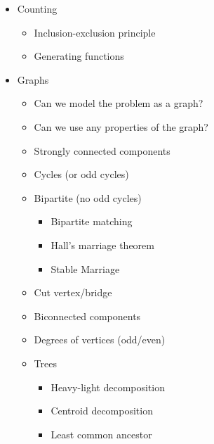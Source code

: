 \documentclass[8pt,a4paper,landscape,oneside]{amsart}
\newenvironment{myitemize}
{ \begin{itemize}[leftmargin=.5cm]
    \setlength{\itemsep}{0pt}
    \setlength{\parskip}{0pt}
    \setlength{\parsep}{0pt}     }
{ \end{itemize}                  }
\begin{document}
\begin{multicols*}{3}
\begin{myitemize}
                    \begin{itemize}
                        \item Sqrt buckets
                        \item Store $2^k$ jump pointers
                        \item $2^k$ merging trick
                    \end{itemize}
                \item Counting
                    \begin{itemize}
                        \item Inclusion-exclusion principle
                        \item Generating functions
                    \end{itemize}
                \item Graphs
                    \begin{itemize}
                        \item Can we model the problem as a graph?
                        \item Can we use any properties of the graph?
                        \item Strongly connected components
                        \item Cycles (or odd cycles)
                        \item Bipartite (no odd cycles)
                            \begin{itemize}
                                \item Bipartite matching
                                \item Hall's marriage theorem
                                \item Stable Marriage
                            \end{itemize}
                        \item Cut vertex/bridge
                        \item Biconnected components
                        \item Degrees of vertices (odd/even)
                        \item Trees
                            \begin{itemize}
                                \item Heavy-light decomposition
                                \item Centroid decomposition
                                \item Least common ancestor

\end{itemize}
\end{itemize}
\end{myitemize}
\end{multicols*}
\end{document}
